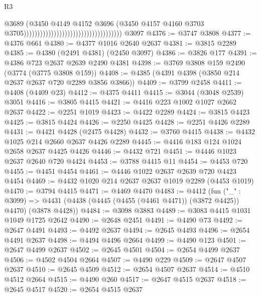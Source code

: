 \begin{lexlean}{R3}
\begin{coremodule}
                                                                        @3689
                                                                        (@3450
                                                                          @4149
                                                                          @4152
                                                                          @3696
                                                                          (@3450
                                                                            @4157
                                                                            @4160
                                                                            @3703
                                                                            @3705))))))))))))))))))))))))))))))))))))
    @3097
@4376 := @3747 @3808
@4377 := @4376 @661
@4380 := @4377 @1016 @2640 @2637
@4381 := @3815 @2289
@4385 := @4380 (@2491 @4381) (@2450 @3097)
@4386 := @3826 @177
@4391 := @4386 @723 @2637 @2639 @2490 @4381
@4398 := @3769 @3808 @159 @2490 (@3774 (@3775 @3808 @159))
@4408 := @4385 (@4391 @4398 (@3850 @214 @2637 @2637 @720 @2289 @3856 @3866))
@4409 := @3799 @2458
@4411 := @4408 (@4409 @23)
@4412 := @4375 @4411
@4415 := @3044 (@3048 @2539) @3051
@4416 := @3805 @4415
@4421 := @4416 @223 @1002 @1027 @2662 @2637
@4422 := @2251 @1019
@4423 := @4422 @2289
@4424 := @3815 @4423
@4425 := @3815 @4424
@4426 := @2250 @4425
@4428 := @2251 @4426 @2289
@4431 := @4421 @4428 (@2475 @4428)
@4432 := @3760 @4415
@4438 := @4432 @1025 @214 @2660 @2637 @4426 @2289
@4445 := @4416 @183 @124 @1024 @2658 @2637 @4425 @4426
@4446 := @4432 @721
@4451 := @4446 @1023 @2637 @2640 @720 @4424
@4453 := @3788 @4415 @11
@4454 := @4453 @720
@4455 := @4451 @4454
@4461 := @4446 @1022 @2637 @2639 @720 @4423 @4454
@4469 := @4432 @1020 @214 @2637 @2637 @1019 @2289 (@4453 @1019)
@4470 := @3794 @4415
@4471 := @4469 @4470
@4483 := @4412
    (fun ("_" : @3099) =>
    @4431 (@4438 (@4445 (@4455 (@4461 @4471)) (@3872 @4425)) @4470) (@3878 @4428))
@4484 := @3098 @3883
@4489 := @3083 @4415 @1031 @1049 @1725 @2642
@4490 := @2648 @2451
@4491 := @4490 @73
@4492 := @2647 @4491
@4493 := @4492 @2637
@4494 := @2645 @4493
@4496 := @2654 @4491 @2637
@4498 := @4494 @4496 @2664
@4499 := @4490 @123
@4501 := @2647 @4499 @2637
@4502 := @2645 @4501
@4504 := @2654 @4499 @2637
@4506 := @4502 @4504 @2664
@4507 := @4490 @229
@4509 := @2647 @4507 @2637
@4510 := @2645 @4509
@4512 := @2654 @4507 @2637
@4514 := @4510 @4512 @2664
@4515 := @4490 @260
@4517 := @2647 @4515 @2637
@4518 := @2645 @4517
@4520 := @2654 @4515 @2637

\end{coremodule}
\end{lexlean}

